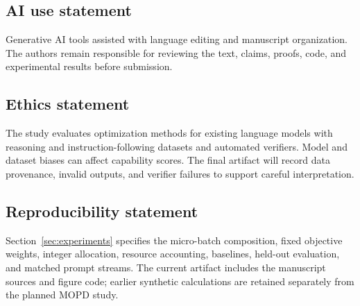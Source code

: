 \subsection*{AI use statement}

Generative AI tools assisted with language editing and manuscript organization.
The authors remain responsible for reviewing the text, claims, proofs, code,
and experimental results before submission.

\subsection*{Ethics statement}

The study evaluates optimization methods for existing language models with
reasoning and instruction-following datasets and automated verifiers. Model and
dataset biases can affect capability scores. The final artifact will record data
provenance, invalid outputs, and verifier failures to support careful
interpretation.

\subsection*{Reproducibility statement}

Section~\ref{sec:experiments} specifies the micro-batch composition, fixed
objective weights, integer allocation, resource accounting, baselines,
held-out evaluation, and matched prompt streams. The current artifact includes
the manuscript sources and figure code; earlier synthetic calculations are
retained separately from the planned MOPD study.
